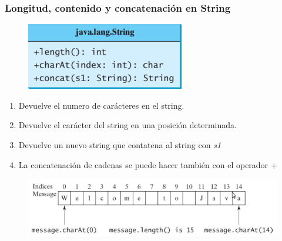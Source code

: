 \documentclass{beamer}
\begin{document}
\begin{frame}
\frametitle{Longitud, contenido y concatenación en String}
\begin{figure}
\includegraphics[scale=0.7]{imagenes/longitud.png}
\end{figure}
\pause
\begin{enumerate}[<+->]
\item Devuelve el numero de carácteres en el string.
\item Devuelve el carácter del string en una posición determinada.
\item Devuelve un nuevo string que contatena al string con \emph{s1}
\item La concatenación de cadenas se puede hacer también con el operador \alert{+}
\end{enumerate}
\pause
\begin{figure}
\includegraphics[scale=0.7]{imagenes/art.png}
\end{figure}
\end{frame}
\end{document}
